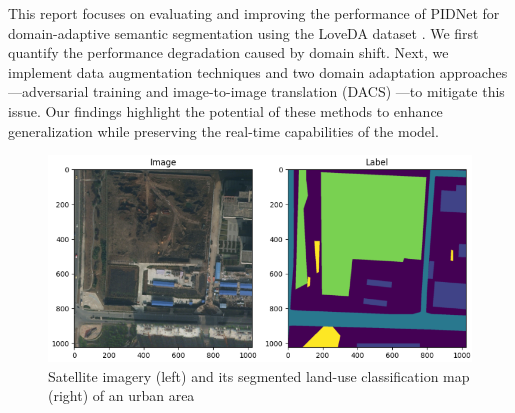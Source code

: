 \documentclass{article}
\begin{document}
\begin{multicols}{2}
		This report focuses on evaluating and improving the performance of PIDNet for domain-adaptive semantic segmentation using the LoveDA dataset \cite{loveda2021}. We first quantify the performance degradation caused by domain shift. Next, we implement data augmentation techniques and two domain adaptation approaches—adversarial training and image-to-image translation (DACS)\cite{tranheden2021dacs} —to mitigate this issue. Our findings highlight the potential of these methods to enhance generalization while preserving the real-time capabilities of the model.
		
		
		\begin{figure}[H]
			\centering
			\includegraphics[width=1\linewidth]{image/urban_1.png}
			\caption{Satellite imagery (left) and its segmented land-use classification map (right) of an urban area}
			\label{fig:urban_image}
		\end{figure}


\end{multicols}
\end{document}
